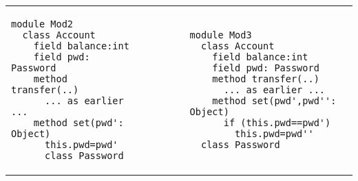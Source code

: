  
\begin{tabular}{lll}
\begin{minipage}[b]{0.35\textwidth}
\begin{lstlisting}[language=chainmail, frame=lines]
module Mod2
  class Account
    field balance:int 
    field pwd: Password 
    method transfer(..) 
      ... as earlier ...
    method set(pwd': Object)
      this.pwd=pwd'
      class Password
\end{lstlisting}
\end{minipage}
&\ \ \  \ \   &%
\begin{minipage}[b]{0.50\textwidth}
\begin{lstlisting}[language=chainmail, frame=lines]
module Mod3
  class Account
    field balance:int 
    field pwd: Password 
    method transfer(..) 
      ... as earlier ...
    method set(pwd',pwd'': Object)
      if (this.pwd==pwd') 
        this.pwd=pwd''
  class Password
\end{lstlisting}
\end{minipage} 
\end{tabular}


